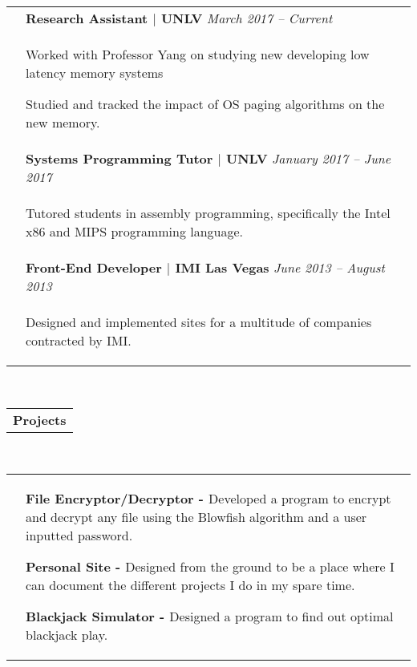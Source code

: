 \documentclass[a4paper,12pt]{extarticle}
\begin{document}
\begin{tabular}[b]{p{1.3cm} p{14.4cm}}
	& {\bf{Research Assistant $|$ UNLV}} \hfill \emph{\footnotesize{March 2017 -- Current}}
    \\ & \small{ \begin{compactitem}
    	\item Worked with Professor Yang on studying new developing low latency\hyphenation{memory} memory systems
    	\item Studied and tracked the impact of OS paging algorithms on the new memory.
	\end{compactitem}} \smallskip \\
    & {\bf{Systems Programming Tutor $|$ UNLV}} \hfill \emph{\footnotesize{January 2017 -- June 2017}}
    \\ & \small{ \begin{compactitem}
    	\item Tutored students in assembly programming, specifically the Intel x86 and MIPS programming language.
	\end{compactitem}} \smallskip \\
    & {\bf{Front-End Developer $|$ IMI Las Vegas}} \hfill \emph{\footnotesize{June 2013 -- August 2013}}
    \\ & \small{\begin{compactitem}
    	\item Designed and implemented sites for a multitude of companies contracted by IMI.
	\end{compactitem}}
\end{tabular} \\
\raggedright{\begin{tabular}[b]{p{5.5cm}}
	\bf{\Large{Projects}} \\
    \cline{1-1}
\end{tabular}} \\
	\begin{tabular}[b]{p{.6cm} p{14.4cm}}
	&
    \begin{compactitem}
    	\item \small{\bf{File Encryptor/Decryptor - }}Developed a program to encrypt and decrypt any file using the Blowfish algorithm and a user inputted password.
	\end{compactitem} \medskip
    \begin{compactitem}
        \item \small{\bf{Personal Site - }}Designed from the ground to be a place where I can document the different projects I do in my spare time.
	\end{compactitem} \medskip
    \begin{compactitem}
        \item \small{\bf{Blackjack Simulator - }}Designed a program to find out optimal blackjack play.
	\end{compactitem}
\end{tabular}
\end{document}
